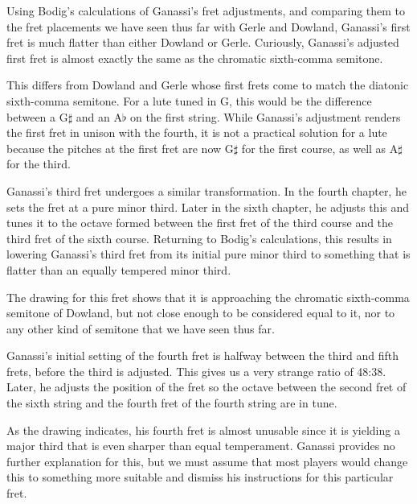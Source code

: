 Using Bodig's calculations of Ganassi's fret adjustments, and comparing them to the
fret placements we have seen thus far with Gerle and Dowland, Ganassi's first fret is
much flatter than either Dowland or Gerle.  Curiously, Ganassi's adjusted first fret is
almost exactly the same as the chromatic sixth-comma semitone.

This differs from Dowland and Gerle whose first frets come to match the diatonic
sixth-comma semitone.  For a lute tuned in G, this would be the difference between a
G$\sharp$ and an A$\flat$ on the first string. While Ganassi's adjustment renders
the first fret in unison with the fourth, it is not a practical solution for a lute
because the pitches at the first fret are now G$\sharp$ for the first course, as well
as A$\sharp$ for the third.

Ganassi's third fret undergoes a similar transformation.  In the fourth chapter, he
sets the fret at a pure minor third.  Later in the sixth chapter, he adjusts this
and tunes it to the octave formed between the first fret of the third course and the
third fret of the sixth course. Returning to Bodig's calculations, this results in
lowering Ganassi's third fret from its initial pure minor third to something that is
flatter than an equally tempered minor third.

The drawing for this fret shows that it is approaching the chromatic sixth-comma semitone
of Dowland, but not close enough to be considered equal to it, nor to any other kind of
semitone that we have seen thus far.

Ganassi's initial setting of the fourth fret is halfway between the third and
fifth frets, before the third is adjusted.  This gives us a very strange ratio of
48:38.  Later, he adjusts the position of the fret so the octave between the second
fret of the sixth string and the fourth fret of the fourth string are in tune.

As the drawing indicates, his fourth fret is almost unusable since it is yielding a
major third that is even sharper than equal temperament.  Ganassi provides no further
explanation for this, but we must assume that most players would change this to
something more suitable and dismiss his instructions for this particular fret.

